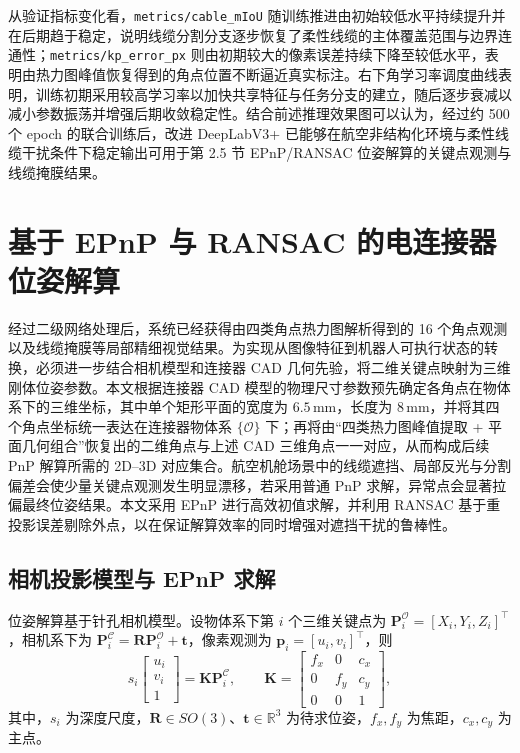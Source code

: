 从验证指标变化看，\texttt{metrics/cable\_mIoU} 随训练推进由初始较低水平持续提升并在后期趋于稳定，说明线缆分割分支逐步恢复了柔性线缆的主体覆盖范围与边界连通性；\texttt{metrics/kp\_error\_px} 则由初期较大的像素误差持续下降至较低水平，表明由热力图峰值恢复得到的角点位置不断逼近真实标注。右下角学习率调度曲线表明，训练初期采用较高学习率以加快共享特征与任务分支的建立，随后逐步衰减以减小参数振荡并增强后期收敛稳定性。结合前述推理效果图可以认为，经过约 500 个 epoch 的联合训练后，改进 DeepLabV3+ 已能够在航空非结构化环境与柔性线缆干扰条件下稳定输出可用于第 2.5 节 EPnP/RANSAC 位姿解算的关键点观测与线缆掩膜结果。

\section{基于 EPnP 与 RANSAC 的电连接器位姿解算}
经过二级网络处理后，系统已经获得由四类角点热力图解析得到的 16 个角点观测以及线缆掩膜等局部精细视觉结果。为实现从图像特征到机器人可执行状态的转换，必须进一步结合相机模型和连接器 CAD 几何先验，将二维关键点映射为三维刚体位姿参数。本文根据连接器 CAD 模型的物理尺寸参数预先确定各角点在物体系下的三维坐标，其中单个矩形平面的宽度为 \(6.5\,\mathrm{mm}\)，长度为 \(8\,\mathrm{mm}\)，并将其四个角点坐标统一表达在连接器物体系 \(\{\mathcal{O}\}\) 下；再将由“四类热力图峰值提取 + 平面几何组合”恢复出的二维角点与上述 CAD 三维角点一一对应，从而构成后续 PnP 解算所需的 2D--3D 对应集合。航空机舱场景中的线缆遮挡、局部反光与分割偏差会使少量关键点观测发生明显漂移，若采用普通 PnP 求解，异常点会显著拉偏最终位姿结果。本文采用 EPnP 进行高效初值求解，并利用 RANSAC 基于重投影误差剔除外点，以在保证解算效率的同时增强对遮挡干扰的鲁棒性。

\subsection{相机投影模型与 EPnP 求解}
位姿解算基于针孔相机模型。设物体系下第 \(i\) 个三维关键点为 \(\mathbf{P}_i^{\mathcal{O}}=[X_i,Y_i,Z_i]^\top\)，相机系下为 \(\mathbf{P}_i^{\mathcal{C}}=\mathbf{R}\mathbf{P}_i^{\mathcal{O}}+\mathbf{t}\)，像素观测为 \(\mathbf{p}_i=[u_i,v_i]^\top\)，则
$$
s_i\begin{bmatrix}u_i\\v_i\\1\end{bmatrix}=\mathbf{K}\mathbf{P}_i^{\mathcal{C}},\qquad
\mathbf{K}=\begin{bmatrix}f_x&0&c_x\\0&f_y&c_y\\0&0&1\end{bmatrix},
$$
其中，\(s_i\) 为深度尺度，\(\mathbf{R}\in SO(3)\)、\(\mathbf{t}\in\mathbb{R}^3\) 为待求位姿，\(f_x,f_y\) 为焦距，\(c_x,c_y\) 为主点。

